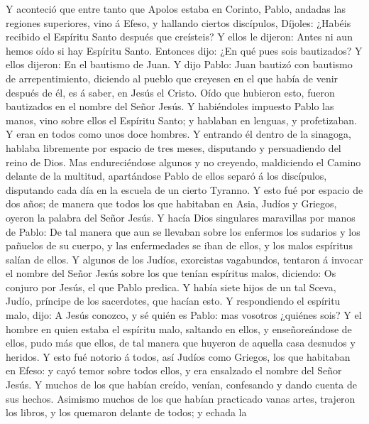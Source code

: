  Y aconteció que entre tanto que Apolos estaba en Corinto,
Pablo, andadas las regiones superiores, vino á Efeso, y hallando ciertos
discípulos,  Díjoles: ¿Habéis recibido el Espíritu Santo
después que creísteis? Y ellos le dijeron: Antes ni aun hemos oído si
hay Espíritu Santo.  Entonces dijo: ¿En qué pues sois
bautizados? Y ellos dijeron: En el bautismo de Juan.  Y
dijo Pablo: Juan bautizó con bautismo de arrepentimiento, diciendo al
pueblo que creyesen en el que había de venir después de él, es á saber,
en Jesús el Cristo.  Oído que hubieron esto, fueron
bautizados en el nombre del Señor Jesús.  Y habiéndoles
impuesto Pablo las manos, vino sobre ellos el Espíritu Santo; y hablaban
en lenguas, y profetizaban.  Y eran en todos como unos
doce hombres.  Y entrando él dentro de la sinagoga,
hablaba libremente por espacio de tres meses, disputando y persuadiendo
del reino de Dios.  Mas endureciéndose algunos y no
creyendo, maldiciendo el Camino delante de la multitud, apartándose
Pablo de ellos separó á los discípulos, disputando cada día en la
escuela de un cierto Tyranno.  Y esto fué por espacio de
dos años; de manera que todos los que habitaban en Asia, Judíos y
Griegos, oyeron la palabra del Señor Jesús.  Y hacía Dios
singulares maravillas por manos de Pablo:  De tal manera
que aun se llevaban sobre los enfermos los sudarios y los pañuelos de su
cuerpo, y las enfermedades se iban de ellos, y los malos espíritus
salían de ellos.  Y algunos de los Judíos, exorcistas
vagabundos, tentaron á invocar el nombre del Señor Jesús sobre los que
tenían espíritus malos, diciendo: Os conjuro por Jesús, el que Pablo
predica.  Y había siete hijos de un tal Sceva, Judío,
príncipe de los sacerdotes, que hacían esto.  Y
respondiendo el espíritu malo, dijo: A Jesús conozco, y sé quién es
Pablo: mas vosotros ¿quiénes sois?  Y el hombre en quien
estaba el espíritu malo, saltando en ellos, y enseñoreándose de ellos,
pudo más que ellos, de tal manera que huyeron de aquella casa desnudos y
heridos.  Y esto fué notorio á todos, así Judíos como
Griegos, los que habitaban en Efeso: y cayó temor sobre todos ellos, y
era ensalzado el nombre del Señor Jesús.  Y muchos de los
que habían creído, venían, confesando y dando cuenta de sus hechos.
 Asimismo muchos de los que habían practicado vanas
artes, trajeron los libros, y los quemaron delante de todos; y echada la
